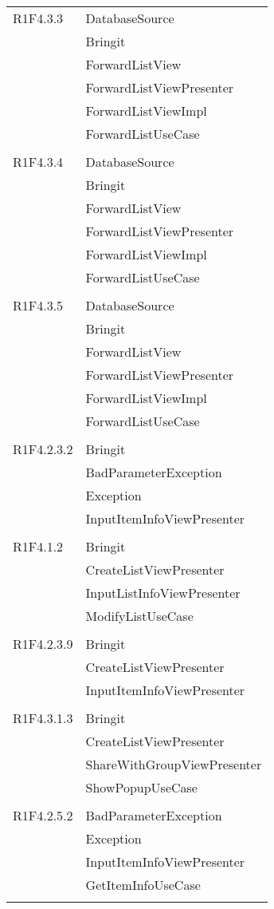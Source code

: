 \begin{center}
\begin{longtable}{|p{7cm}|p{7cm}|}
		R1F4.3.3 & DatabaseSource \\ & Bringit \\ & ForwardListView \\ & ForwardListViewPresenter \\ & ForwardListViewImpl \\ & ForwardListUseCase \\ & \\ \hline
		R1F4.3.4 & DatabaseSource \\ & Bringit \\ & ForwardListView \\ & ForwardListViewPresenter \\ & ForwardListViewImpl \\ & ForwardListUseCase \\ & \\ \hline
		R1F4.3.5 & DatabaseSource \\ & Bringit \\ & ForwardListView \\ & ForwardListViewPresenter \\ & ForwardListViewImpl \\ & ForwardListUseCase \\ & \\ \hline
		R1F4.2.3.2 & Bringit \\ & BadParameterException \\ & Exception \\ & InputItemInfoViewPresenter \\ & \\ \hline
		R1F4.1.2 & Bringit \\ & CreateListViewPresenter \\ & InputListInfoViewPresenter \\ & ModifyListUseCase \\ & \\ \hline
		R1F4.2.3.9 & Bringit \\ & CreateListViewPresenter \\ & InputItemInfoViewPresenter \\ & \\ \hline
		R1F4.3.1.3 & Bringit \\ & CreateListViewPresenter \\ & ShareWithGroupViewPresenter \\ & ShowPopupUseCase \\ & \\ \hline
		R1F4.2.5.2 & BadParameterException \\ & Exception \\ & InputItemInfoViewPresenter \\ & GetItemInfoUseCase \\ & \\ \hline

\end{longtable}
\end{center}

